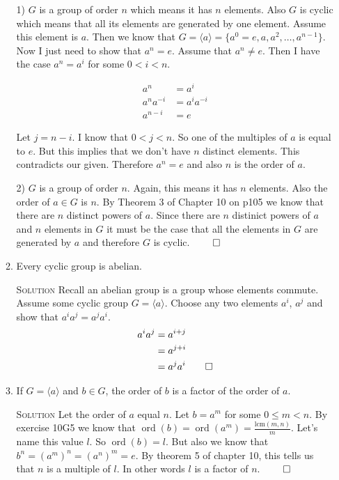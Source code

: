\documentclass[twoside]{amsart}
\newcommand{\solution}{\textsc{Solution}\xspace}
\newcommand{\blank}{\vspace{5pt}}
\newcommand{\itm}{\blank\item}
\newcommand{\sol}{\blank\noindent\solution}
\newcommand{\ord}{\mathop{\mathrm{ord}}}
\begin{document}
\begin{enumerate}[A.]
\begin{enumerate}[1)]
      1) $G$ is a group of order $n$ which means it has $n$ elements. 
      Also $G$ is cyclic which means that all its elements are generated
      by one element. Assume this element is $a$. Then we know that
      $G = \langle a \rangle = \{a^0=e,a,a^2,\ldots,a^{n-1}\}$. Now
      I just need to show that $a^n = e$. Assume that $a^n \ne e$.
      Then I have the case $a^n = a^i$ for some $0 < i < n$.

      \begin{align*}
         a^n &= a^i \\
         a^na^{-i} &= a^ia^{-i} \\
         a^{n-i} &= e
      \end{align*}

      Let $j = n-i$. I know that $0 < j < n$. So one of the multiples of
      $a$ is equal to $e$. But this implies that we don't have $n$ distinct
      elements. This contradicts our given. Therefore $a^n = e$ and also
      $n$ is the order of $a$.

      2) $G$ is a group of order $n$. Again, this means it has $n$ elements.
      Also the order of $a \in G$ is $n$. By Theorem 3 of Chapter 10 on p105
      we know that there are $n$ distinct powers of $a$. Since there
      are $n$ distinict powers of $a$ and $n$ elements in $G$ it must be
      the case that all the elements in $G$ are generated by $a$ and
      therefore $G$ is cyclic. $\qed$

      \itm Every cyclic group is abelian.

      \sol Recall an abelian group is a group whose elements 
      commute. Assume some cyclic group $G = \langle a \rangle$. Choose
      any two elements $a^i$, $a^j$ and show that $a^i a^j = a^j a^i$.
      \begin{align*}
         a^i a^j &= a^{i+j} \\
                 &= a^{j+i} \\
                 &= a^j a^i \qed
      \end{align*}

      \itm If $G = \langle a \rangle$ and $b \in G$, the order of $b$
      is a factor of the order of $a$.

      \sol Let the order of $a$ equal $n$. Let $b=a^m$ for some $0 \le m < n$.
      By exercise 10G5 we know that $\ord(b) = \ord(a^m) =
      \frac{\mathrm{lcm}(m,n)}{m}$.  Let's name this value $l$.
      So $\ord(b)=l$. But also we know that $b^n = (a^m)^n = (a^n)^m = e$.
      By theorem 5 of chapter 10, this tells us that $n$ is a multiple of
      $l$. In other words $l$ is a factor of $n$. $\qed$


\end{enumerate}
\end{enumerate}
\end{document}
